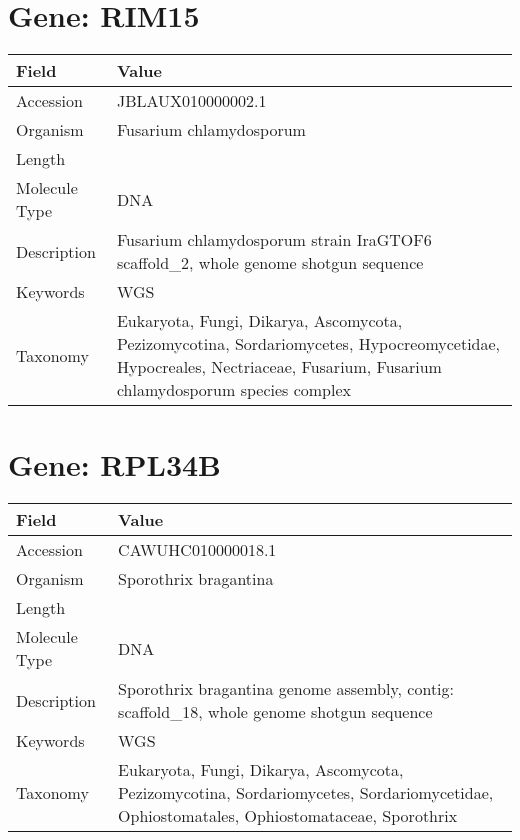 \documentclass[10pt]{article}
\begin{document}
\section{Gene: RIM15}
{\footnotesize
\begin{longtable}{>{\raggedright\arraybackslash}p{4.5cm} >{\raggedright\arraybackslash}p{11.5cm}}
\textbf{Field} & \textbf{Value} \\
\hline
Accession & JBLAUX010000002.1 \\
Organism & Fusarium chlamydosporum \\
Length & 4416796 \\
Molecule Type & DNA \\
Description & Fusarium chlamydosporum strain IraGTOF6 scaffold\_2, whole genome shotgun sequence \\
Keywords & WGS \\
Taxonomy & Eukaryota, Fungi, Dikarya, Ascomycota, Pezizomycotina, Sordariomycetes, Hypocreomycetidae, Hypocreales, Nectriaceae, Fusarium, Fusarium chlamydosporum species complex \\
\end{longtable}
}

\vspace{1em}
\section{Gene: RPL34B}
{\footnotesize
\begin{longtable}{>{\raggedright\arraybackslash}p{4.5cm} >{\raggedright\arraybackslash}p{11.5cm}}
\textbf{Field} & \textbf{Value} \\
\hline
Accession & CAWUHC010000018.1 \\
Organism & Sporothrix bragantina \\
Length & 445038 \\
Molecule Type & DNA \\
Description & Sporothrix bragantina genome assembly, contig: scaffold\_18, whole genome shotgun sequence \\
Keywords & WGS \\
Taxonomy & Eukaryota, Fungi, Dikarya, Ascomycota, Pezizomycotina, Sordariomycetes, Sordariomycetidae, Ophiostomatales, Ophiostomataceae, Sporothrix \\
\end{longtable}
}

\vspace{1em}
\end{document}
